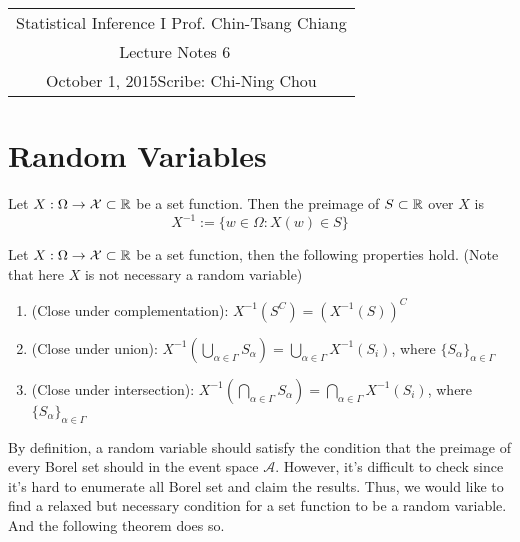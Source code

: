 \documentclass[11pt]{article}
\newcommand{\scribe}{Chi-Ning Chou}
\newcommand{\lecnum}{6}
\newcommand{\lecdate}{October 1, 2015}
\begin{document}
	
	\begin{center}
		\renewcommand{\arraystretch}{2}
		\begin{bfseries}
			\begin{tabular}{|c|}
				\hline
				Statistical Inference I \hfill Prof. Chin-Tsang Chiang\\
				\hspace{15em} {\large Lecture Notes \lecnum} \hspace{15em}\ \\
				\lecdate \hfill Scribe: \scribe\\
				\hline
			\end{tabular}
			\renewcommand{\arraystretch}{1}
		\end{bfseries}
	\end{center}
	
\section{Random Variables}
\begin{definition}
	Let $X:\Omega\rightarrow\mathcal{X}\subset{\mathbb R}$ be a set function. Then the preimage of $S\subset{\mathbb R}$ over $X$ is
	$$X^{-1}:=\{w\in\Omega:X(w)\in S \}$$
\end{definition}

\begin{property}\label{propertyofsetfuncs}
	Let $X:\Omega\rightarrow\mathcal{X}\subset{\mathbb R}$ be a set function, then the following properties hold. (Note that here $X$ is not necessary a random variable)
	\begin{enumerate}
		\item (Close under complementation): $X^{-1}(S^C) = (X^{-1}(S))^C$
		\item (Close under union): $X^{-1}(\bigcup_{\alpha\in\Gamma}S_{\alpha}) = \bigcup_{\alpha\in\Gamma}X^{-1}(S_i)$, where $\{S_{\alpha}\}_{\alpha\in\Gamma}$
		\item (Close under intersection): $X^{-1}(\bigcap_{\alpha\in\Gamma}S_{\alpha}) = \bigcap_{\alpha\in\Gamma}X^{-1}(S_i)$, where $\{S_{\alpha}\}_{\alpha\in\Gamma}$
	\end{enumerate}
\end{property}

By definition, a random variable should satisfy the condition that the preimage of every Borel set should in the event space $\mathcal{A}$. However, it's difficult to check since it's hard to enumerate all Borel set and claim the results. Thus, we would like to find a relaxed but necessary condition for a set function to be a random variable. And the following theorem does so.
\end{document}
